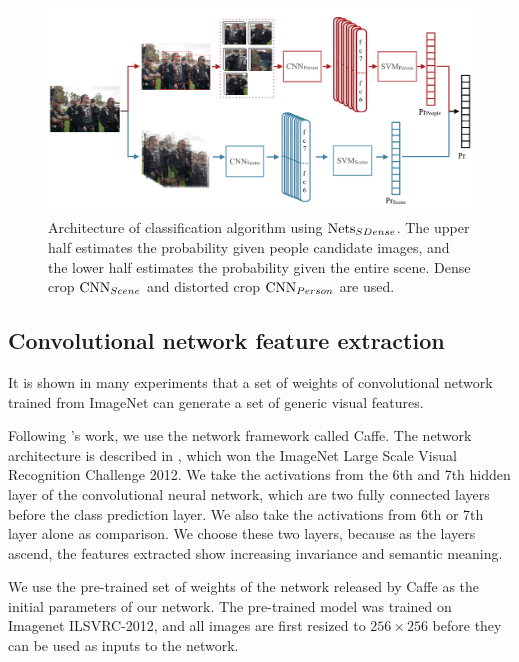 \documentclass[10pt,twocolumn,letterpaper]{article}
\begin{document}
\begin{figure}[t]
\begin{center}
\includegraphics[width=0.8\linewidth]{flowchart2}
\end{center}
   \caption{Architecture of classification algorithm using $\textup{Nets}_{SDense}$. The upper half estimates the probability given people candidate images, and the lower half estimates the probability given the entire scene. Dense crop $\textup{CNN}_{Scene}$ and distorted crop $\textup{CNN}_{Person}$ are used.}
\label{Flowchart}
\end{figure}



\subsection{Convolutional network feature extraction}
\label{sectioncnn}
It is shown in many experiments that a set of weights of convolutional network trained from ImageNet can generate a set of generic visual features.

Following \cite{caffe}'s work, we use the network framework called Caffe. The network architecture is described in \cite{Imagenet}, which won the ImageNet Large Scale Visual Recognition Challenge 2012. We take the activations from the 6th and 7th hidden layer of the convolutional neural network, which are two fully connected layers before the class prediction layer. We also take the activations from 6th or 7th layer alone as comparison. We choose these two layers, because as the layers ascend, the features extracted show increasing invariance and semantic meaning. 

We use the pre-trained set of weights of the network released by Caffe as the initial parameters of our network. The pre-trained model was trained on Imagenet ILSVRC-2012, and all images are first resized to $256\times256$ before they can be used as inputs to the network.
\end{document}
